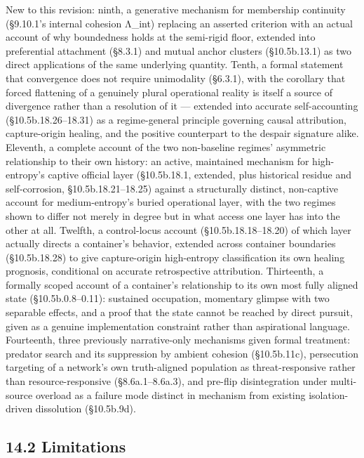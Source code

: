 \documentclass[
]{article}
\begin{document}
New to this revision: ninth, a generative mechanism for membership
continuity (§9.10.1's internal cohesion Λ\_int) replacing an asserted
criterion with an actual account of why boundedness holds at the
semi-rigid floor, extended into preferential attachment (§8.3.1) and
mutual anchor clusters (§10.5b.13.1) as two direct applications of the
same underlying quantity. Tenth, a formal statement that convergence
does not require unimodality (§6.3.1), with the corollary that forced
flattening of a genuinely plural operational reality is itself a source
of divergence rather than a resolution of it --- extended into accurate
self-accounting (§10.5b.18.26--18.31) as a regime-general principle
governing causal attribution, capture-origin healing, and the positive
counterpart to the despair signature alike. Eleventh, a complete account
of the two non-baseline regimes' asymmetric relationship to their own
history: an active, maintained mechanism for high-entropy's captive
official layer (§10.5b.18.1, extended, plus historical residue and
self-corrosion, §10.5b.18.21--18.25) against a structurally distinct,
non-captive account for medium-entropy's buried operational layer, with
the two regimes shown to differ not merely in degree but in what access
one layer has into the other at all. Twelfth, a control-locus account
(§10.5b.18.18--18.20) of which layer actually directs a container's
behavior, extended across container boundaries (§10.5b.18.28) to give
capture-origin high-entropy classification its own healing prognosis,
conditional on accurate retrospective attribution. Thirteenth, a
formally scoped account of a container's relationship to its own most
fully aligned state (§10.5b.0.8--0.11): sustained occupation, momentary
glimpse with two separable effects, and a proof that the state cannot be
reached by direct pursuit, given as a genuine implementation constraint
rather than aspirational language. Fourteenth, three previously
narrative-only mechanisms given formal treatment: predator search and
its suppression by ambient cohesion (§10.5b.11c), persecution targeting
of a network's own truth-aligned population as threat-responsive rather
than resource-responsive (§8.6a.1--8.6a.3), and pre-flip disintegration
under multi-source overload as a failure mode distinct in mechanism from
existing isolation-driven dissolution (§10.5b.9d).

\hypertarget{limitations}{%
\subsection{14.2 Limitations}\label{limitations}}
\end{document}
